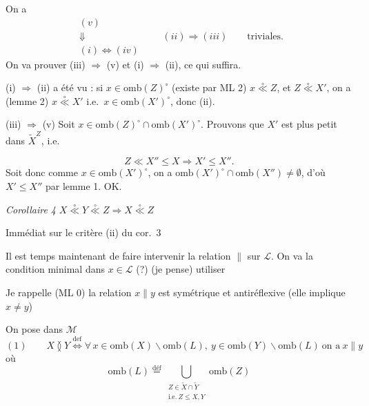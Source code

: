 \documentclass[11pt,a4paper]{article}
\begin{document}
On a
\[
  \begin{array}{c}
    (v) \\ \Downarrow \\ (i) \Longleftrightarrow (iv)
  \end{array}
  \qquad (ii) \Longrightarrow (iii) \qquad \text{triviales.}
\]
On va prouver (iii) $\Longrightarrow$ (v) et (i) $\Longrightarrow$ (ii), ce qui suffira.

(i) $\Longrightarrow$ (ii) a été vu : si $x \in \mathrm{omb}(Z)^{\circ}$ (existe par ML 2) \ill{} $x \mathrel{\overset{\circ}{\ll}} Z$, et $Z \mathrel{\overset{\circ}{\ll}} X'$, on a (lemme 2) $x \mathrel{\overset{\circ}{\ll}} X'$ i.e.\ $x \in \mathrm{omb}(X')^{\circ}$, donc (ii).

(iii) $\Longrightarrow$ (v) Soit $x \in \mathrm{omb}(Z)^{\circ} \cap \mathrm{omb}(X')^{\circ}$. Prouvons que $X'$ est plus petit dans $\widetilde{X}^{Z}$, i.e.

\[
  Z \ll X'' \leq X \Longrightarrow X' \leq X'' .
\]
Soit donc  comme $x \in \mathrm{omb}(X')^{\circ}$,  on a $\mathrm{omb}(X')^{\circ} \cap \mathrm{omb}(X'') \neq \emptyset$, d'où $X' \leq X''$ par lemme 1. OK.

\emph{Corollaire 4} \quad $X \mathrel{\overset{\circ}{\ll}} Y \mathrel{\overset{\circ}{\ll}} Z \Longrightarrow X \mathrel{\overset{\circ}{\ll}} Z$

Immédiat sur le critère (ii) du cor.~3

Il est temps maintenant de faire intervenir la relation $\parallel$ sur \struck{\ill{}} $\mathcal{L}$. On va \struck{\ill{}} \ill{} la condition minimal dans $x \in \mathcal{L}$ (?) (je pense) utiliser

 Je rappelle
(ML 0) \quad la relation $x \parallel y$  est symétrique et antiréflexive (elle implique $x \neq y$)

On pose dans $\mathcal{M}$
\[
  (1) \qquad X \between Y \overset{\mathrm{def}}{\iff} \forall\, x \in \mathrm{omb}(X) \smallsetminus \mathrm{omb}(L),\ y \in \mathrm{omb}(Y) \smallsetminus \mathrm{omb}(L) \ \text{on a}\ x \parallel y
\]
où
\[
  \mathrm{omb}(L) \overset{\mathrm{déf}}{=} \bigcup_{\substack{Z \in \widetilde{X} \cap \widetilde{Y} \\ \text{i.e.}\ Z \leq X, Y}} \mathrm{omb}(Z)
\]
\end{document}
